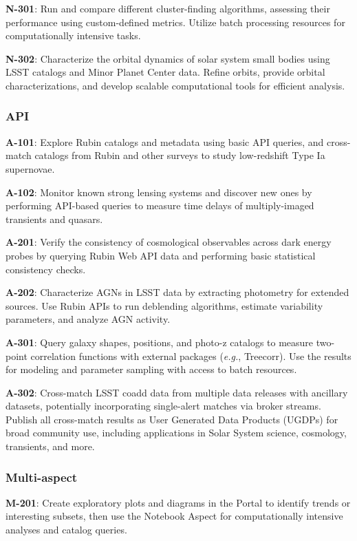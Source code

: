 \textbf{N-301}: Run and compare different cluster-finding algorithms, assessing their performance using custom-defined metrics. Utilize batch processing resources for computationally intensive tasks.

\textbf{N-302}: Characterize the orbital dynamics of solar system small bodies using LSST catalogs and Minor Planet Center data.
Refine orbits, provide orbital characterizations, and develop scalable computational tools for efficient analysis.

\subsubsection{API}

\textbf{A-101}: Explore Rubin catalogs and metadata using basic API queries, and cross-match catalogs from Rubin and other surveys to study low-redshift Type Ia supernovae.

\textbf{A-102}: Monitor known strong lensing systems and discover new ones by performing API-based queries to measure time delays of multiply-imaged transients and quasars.

\textbf{A-201}: Verify the consistency of cosmological observables across dark energy probes by querying Rubin Web API data and performing basic statistical consistency checks.

\textbf{A-202}: Characterize AGNs in LSST data by extracting photometry for extended sources. Use Rubin APIs to run deblending algorithms, estimate variability parameters, and analyze AGN activity.

\textbf{A-301}: Query galaxy shapes, positions, and photo-z catalogs to measure two-point correlation functions with external packages (\emph{e.g.}, Treecorr).
Use the results for modeling and parameter sampling with access to batch resources.

\textbf{A-302}: Cross-match LSST coadd data from multiple data releases with ancillary datasets, potentially incorporating single-alert matches via broker streams.
Publish all cross-match results as User Generated Data Products (UGDPs) for broad community use, including applications in Solar System science, cosmology, transients, and more.

\subsubsection{Multi-aspect}

\textbf{M-201}: Create exploratory plots and diagrams in the Portal to identify trends or interesting subsets, then use the Notebook Aspect for computationally intensive analyses and catalog queries.
